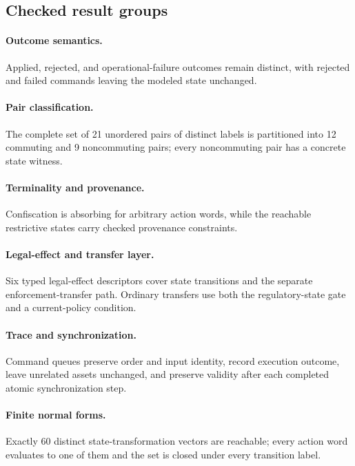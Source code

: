 \documentclass[11pt,a4paper]{article}
\begin{document}
\subsection{Checked result groups}

\paragraph{Outcome semantics.}
Applied, rejected, and operational-failure outcomes remain distinct, with
rejected and failed commands leaving the modeled state unchanged.

\paragraph{Pair classification.}
The complete set of 21 unordered pairs of distinct labels is partitioned into
12 commuting and 9 noncommuting pairs; every noncommuting pair has a concrete
state witness.

\paragraph{Terminality and provenance.}
Confiscation is absorbing for arbitrary action words, while the reachable
restrictive states carry checked provenance constraints.

\paragraph{Legal-effect and transfer layer.}
Six typed legal-effect descriptors cover state transitions and the separate
enforcement-transfer path.  Ordinary transfers use both the regulatory-state
gate and a current-policy condition.

\paragraph{Trace and synchronization.}
Command queues preserve order and input identity, record execution outcome,
leave unrelated assets unchanged, and preserve validity after each completed
atomic synchronization step.

\paragraph{Finite normal forms.}
Exactly 60 distinct state-transformation vectors are reachable; every action
word evaluates to one of them and the set is closed under every transition
label.
\end{document}
